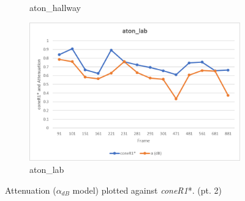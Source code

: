 \begin{appendices}
\begin{figure}
\begin{subfigure}{.45\linewidth}
  \caption{aton\_hallway}
\end{subfigure}
\hfill
\begin{subfigure}{.45\linewidth}
  \includegraphics[width=1\linewidth]{figures/appendix/lab_db.jpg}
  \caption{aton\_lab}
\end{subfigure}

\caption{Attenuation ($\alpha_{dB}$ model) plotted against \textit{coneR1}*. (pt. 2)}
\end{figure}


\end{appendices}
